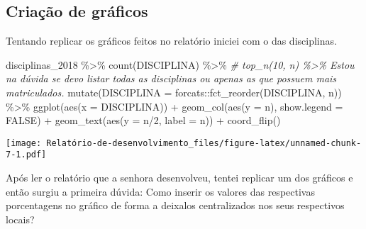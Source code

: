\documentclass[
]{article}
\newenvironment{Shaded}{\begin{snugshade}}{\end{snugshade}}
\newcommand{\AttributeTok}[1]{\textcolor[rgb]{0.77,0.63,0.00}{#1}}
\newcommand{\CommentTok}[1]{\textcolor[rgb]{0.56,0.35,0.01}{\textit{#1}}}
\newcommand{\ConstantTok}[1]{\textcolor[rgb]{0.00,0.00,0.00}{#1}}
\newcommand{\DecValTok}[1]{\textcolor[rgb]{0.00,0.00,0.81}{#1}}
\newcommand{\FunctionTok}[1]{\textcolor[rgb]{0.00,0.00,0.00}{#1}}
\newcommand{\NormalTok}[1]{#1}
\newcommand{\SpecialCharTok}[1]{\textcolor[rgb]{0.00,0.00,0.00}{#1}}
\begin{document}
\hypertarget{criauxe7uxe3o-de-gruxe1ficos}{%
\subsection{Criação de gráficos}\label{criauxe7uxe3o-de-gruxe1ficos}}

Tentando replicar os gráficos feitos no relatório iniciei com o das
disciplinas.

\begin{Shaded}
\begin{Highlighting}[]
\NormalTok{disciplinas\_2018 }\SpecialCharTok{\%\textgreater{}\%}
  \FunctionTok{count}\NormalTok{(DISCIPLINA) }\SpecialCharTok{\%\textgreater{}\%}
  \CommentTok{\# top\_n(10, n) \%\textgreater{}\%  Estou na dúvida se devo listar todas as disciplinas ou apenas as que possuem mais matriculados.}
  \FunctionTok{mutate}\NormalTok{(}\AttributeTok{DISCIPLINA =}\NormalTok{ forcats}\SpecialCharTok{::}\FunctionTok{fct\_reorder}\NormalTok{(DISCIPLINA, n)) }\SpecialCharTok{\%\textgreater{}\%}
  \FunctionTok{ggplot}\NormalTok{(}\FunctionTok{aes}\NormalTok{(}\AttributeTok{x =}\NormalTok{ DISCIPLINA)) }\SpecialCharTok{+}
  \FunctionTok{geom\_col}\NormalTok{(}\FunctionTok{aes}\NormalTok{(}\AttributeTok{y =}\NormalTok{ n), }\AttributeTok{show.legend =} \ConstantTok{FALSE}\NormalTok{) }\SpecialCharTok{+}
  \FunctionTok{geom\_text}\NormalTok{(}\FunctionTok{aes}\NormalTok{(}\AttributeTok{y =}\NormalTok{ n}\SpecialCharTok{/}\DecValTok{2}\NormalTok{, }\AttributeTok{label =}\NormalTok{ n)) }\SpecialCharTok{+}
  \FunctionTok{coord\_flip}\NormalTok{()}
\end{Highlighting}
\end{Shaded}

\texttt{[image: Relatório-de-desenvolvimento\_files/figure-latex/unnamed-chunk-7-1.pdf]}

Após ler o relatório que a senhora desenvolveu, tentei replicar um dos
gráficos e então surgiu a primeira dúvida: Como inserir os valores das
respectivas porcentagens no gráfico de forma a deixalos centralizados
nos seus respectivos locais?
\end{document}
